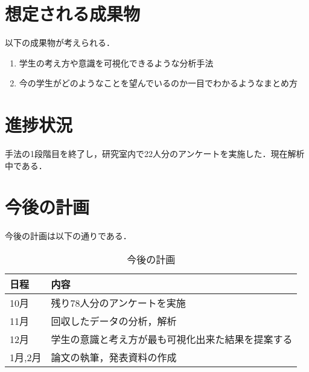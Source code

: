 \documentclass[uplatex,twocolumn,dvipdfmx]{jsarticle}
\begin{document}
\section{想定される成果物}
以下の成果物が考えられる．
\begin{enumerate}
\item 学生の考え方や意識を可視化できるような分析手法
\item 今の学生がどのようなことを望んでいるのか一目でわかるようなまとめ方
\end{enumerate}

\section{進捗状況}
手法の1段階目を終了し，研究室内で22人分のアンケートを実施した．現在解析中である．

\section{今後の計画}

今後の計画は以下の通りである．
\begin{table}[htbp]
\centering
\caption{今後の計画}
\label{tab:dox}
\begin{tabularx}{\linewidth}{|X|X|}\hline
日程 & 内容  \\ \hline \hline
    10月 & 残り78人分のアンケートを実施 \\
    11月 & 回収したデータの分析，解析 \\
    12月 & 学生の意識と考え方が最も可視化出来た結果を提案する \\
    1月,2月 & 論文の執筆，発表資料の作成 \\
\hline
\end{tabularx}
\end{table}

    


\end{document}
